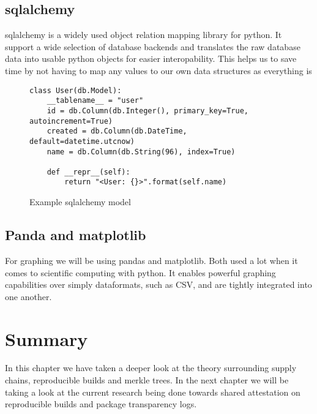 \documentclass[../Main/thesis.tex]{subfiles}
\begin{document}
\subsection*{sqlalchemy}
sqlalchemy is a widely used object relation mapping library for python. It
support a wide selection of database backends and translates the raw database
data into usable python objects for easier interopability. This helps us to save
time by not having to map any values to our own data structures as everything is 

\begin{figure}[H]
\begin{verbatim}
class User(db.Model):
    __tablename__ = "user"
    id = db.Column(db.Integer(), primary_key=True, autoincrement=True)
    created = db.Column(db.DateTime, default=datetime.utcnow)
    name = db.Column(db.String(96), index=True)

    def __repr__(self):
        return "<User: {}>".format(self.name)
\end{verbatim}
\caption{Example sqlalchemy model}
\label{fig:sqlalchemy}
\end{figure}


\subsection*{Panda and matplotlib}
For graphing we will be using pandas and matplotlib. Both used a lot when it
comes to scientific computing with python. It enables powerful graphing
capabilities over simply dataformats, such as CSV, and are tightly integrated
into one another.

\section*{Summary}\label{sec:summary-technologies} 
In this chapter we have taken a deeper look at the theory surrounding supply
chains, reproducible builds and merkle trees. In the next chapter we will be
taking a look at the current research being done towards shared attestation on
reproducible builds and package transparency logs.

\blankpage
\end{document}
